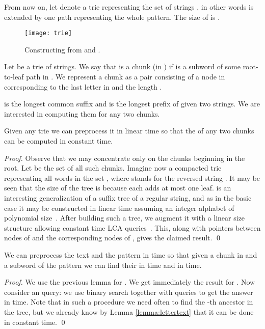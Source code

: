 \documentclass[runningheads]{llncs}
\begin{document}
From now on, let  denote a trie representing the set of strings , in other words  is  extended by one path representing the whole pattern. The size of  is .

\begin{figure}[t]
\centering
\texttt{[image: trie]}
\caption{Constructing  from  and .}
\label{figure:trie_pattern}
\end{figure}


\begin{definition}
Let  be a trie of strings. We say that  is a chunk (in ) if  is a subword of some root-to-leaf path in . We represent a chunk as a pair consisting of a node in  corresponding to the last letter in  and the length .
\end{definition}

 is the longest common suffix and  is the longest prefix of given two strings. We are interested in computing them for any two chunks.

\begin{lemma}\label{lemma:LCSuf}
Given any trie  we can preprocess it in linear time so that the  of any two chunks can be computed in constant time.
\end{lemma}

\begin{proof}
Observe that we may concentrate only on the chunks beginning in the root. Let  be the set of all such chunks. Imagine now a compacted trie  representing all words in the set , where  stands for the reversed string . It may be seen that the size of the tree is  because each  adds at most one leaf.  is an interesting generalization of a suffix tree of a regular string, and as in the basic case it may be constructed in linear time assuming an integer alphabet of polynomial size~\cite{Shibuya99}. After building such a tree, we augment it with a linear size structure allowing constant time LCA queries~\cite{Bender}. This, along with pointers between nodes of  and the corresponding nodes of , gives the claimed result.
\qed
\end{proof}

\begin{lemma}\label{lemma:LCPref}
We can preprocess the text and the pattern in  time so that given a chunk in  and a subword of the pattern we can find their  in  time and  in  time.
\end{lemma}
\begin{proof}
We use the previous lemma for . We get immediately the result for . Now consider an  query: we use binary search together with  queries to get the answer in  time. Note that in such a procedure we need often to find the -th ancestor in the tree, but we already know by Lemma \ref{lemma:lettertext} that it can be done in constant time.
\qed
\end{proof}
\end{document}
